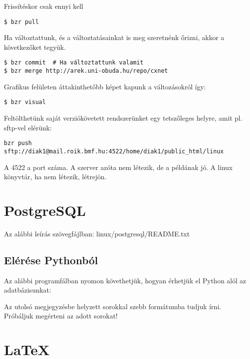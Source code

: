 \documentclass[a4paper]{article}
\begin{document}
Frissítéskor csak ennyi kell

\begin{Verbatim}
$ bzr pull
\end{Verbatim}

Ha változtattunk, és a változtatásainkat is meg szeretnénk őrizni, akkor
a következőket tegyük.

\begin{Verbatim}
$ bzr commit  # Ha változtattunk valamit
$ bzr merge http://arek.uni-obuda.hu/repo/cxnet
\end{Verbatim}

Grafikus felületen áttakinthetőbb képet kapunk a változásokról így:
\begin{Verbatim}
$ bzr visual
\end{Verbatim}

Feltölthetünk saját verziókövetett rendszerünket egy tetszőleges helyre,
amit pl. sftp-vel elérünk:
\begin{Verbatim}
bzr push sftp://diak1@mail.roik.bmf.hu:4522/home/diak1/public_html/linux
\end{Verbatim}
A 4522 a port száma. A szerver azóta nem létezik, de a példának jó. A
linux könyvtár, ha nem létezik, létrejön.

\newpage
\section{PostgreSQL}

Az alábbi leírás szövegfájlban: linux/postgresql/README.txt



%

\subsection{Elérése Pythonból}

Az alábbi programfálban nyomon követhetjük, hogyan érhetjük el Python
alól az adatbázisunkat:


Az utolsó megjegyzésbe helyzett sorokkal szebb formátumba tudjuk írni.
Próbáljuk megérteni az adott sorokat!

\section{\LaTeX}
\end{document}
